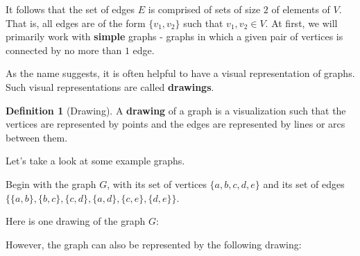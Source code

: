 \documentclass{scrippsthesisclass}
\theoremstyle{definition}
\newtheorem{defn}{Definition}[section]
\begin{document}
It follows that the set of edges $E$ is comprised of sets of size $2$ of elements of $V$. That is, all edges are of the form $\{v_1, v_2\}$ such that $v_1, v_2 \in V$. 
At first, we will primarily work with \textbf{simple}  graphs - graphs in which a given pair of vertices is connected by no more than $1$ edge. 

As the name suggests, it is often helpful to have a visual representation of graphs. Such visual representations are called \textbf{drawings}. 

\begin{defn}[Drawing]
    A \textbf{drawing} of a graph is a visualization such that the vertices are represented by points and the edges are represented by lines or arcs between them. 
\end{defn}


Let's take a look at some example graphs.

Begin with the graph $G$, with its set of vertices $\{a, b, c, d, e\}$ and its set of edges $\{\{a, b\},\{b, c\}, \{c, d\}, \{a, d\}, \{c, e\}, \{d, e\}\}$. 

Here is one drawing of the graph $G$:
\begin{center}
\end{center}


However, the graph can also be represented by the following drawing:
\begin{center}
\end{center}
\end{document}

